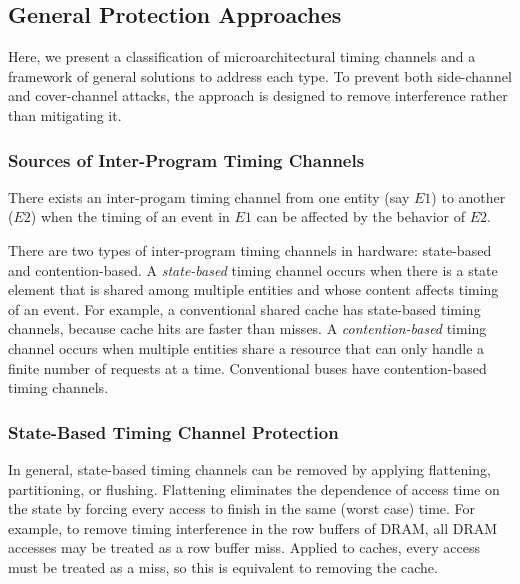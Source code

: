 \subsection{General Protection Approaches}
\label{sec:general_approaches}

Here, we present a classification of microarchitectural timing 
channels and a framework of general solutions to address each type.
To prevent both side-channel and cover-channel attacks,
the approach is designed to remove interference rather than mitigating it.

\subsubsection{Sources of Inter-Program Timing Channels}

There exists an inter-progam timing channel from one entity (say $E1$)
to another ($E2$) when the timing of an event in $E1$ can be affected by 
the behavior of $E2$.

There are two types of inter-program timing channels in hardware: state-based
and contention-based.
A \emph{state-based} timing channel occurs when there is a state element 
that is shared among multiple entities and whose
content affects timing of an event.
For example, a conventional shared cache has state-based timing channels, 
because cache hits are faster than misses.
A \emph{contention-based} timing channel occurs when multiple entities 
share a resource that can only handle a finite number of requests at a time.
Conventional buses have contention-based timing channels.

\subsubsection{State-Based Timing Channel Protection}

In general, state-based timing channels can be removed by applying 
flattening, partitioning, or flushing.
Flattening eliminates the dependence of access time on the state by forcing 
every access to finish in the same (worst case) time. For example, to remove 
timing interference in the row buffers of DRAM, all DRAM accesses may be 
treated as a row buffer miss.
Applied to caches, every 
access must be treated as a miss, so this is equivalent to removing the cache. 

